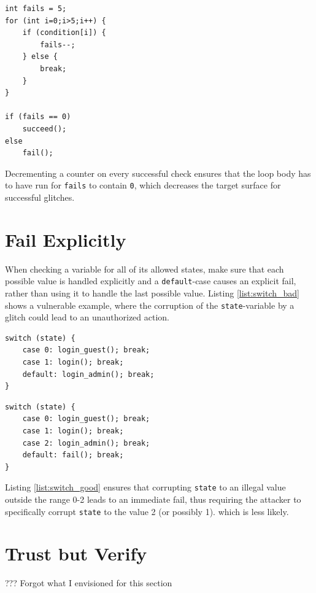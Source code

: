 \begin{lstlisting}[caption={check-bad},label={list:check_good}]
int fails = 5;
for (int i=0;i>5;i++) {
	if (condition[i]) {
		fails--;
	} else {
		break;
	}
}

if (fails == 0)
	succeed();
else
	fail();
\end{lstlisting}

Decrementing a counter on every successful check ensures that the loop body has to have run for \texttt{fails} to contain \texttt{0}, which decreases the target surface for successful glitches.

\section{Fail Explicitly}
\label{sec:fail_explicit}

When checking a variable for all of its allowed states, make sure that each possible value is handled explicitly and a \texttt{default}-case causes an explicit fail, rather than using it to handle the last possible value. Listing \ref{list:switch_bad} shows a vulnerable example, where the corruption of the \texttt{state}-variable by a glitch could lead to an unauthorized action.

\begin{lstlisting}[caption={check-bad},label={list:switch_bad}]
switch (state) {
	case 0: login_guest(); break;
	case 1: login(); break;
	default: login_admin(); break;
}
\end{lstlisting}

\begin{lstlisting}[caption={check-bad},label={list:switch_good}]
switch (state) {
	case 0: login_guest(); break;
	case 1: login(); break;
	case 2: login_admin(); break;
	default: fail(); break;
}
\end{lstlisting}

Listing \ref{list:switch_good} ensures that corrupting \texttt{state} to an illegal value outside the range 0-2 leads to an immediate fail, thus requiring the attacker to specifically corrupt \texttt{state} to the value 2 (or possibly 1). which is less likely.\,\cite{witteman2008secure}


\section{Trust but Verify}
??? Forgot what I envisioned for this section
